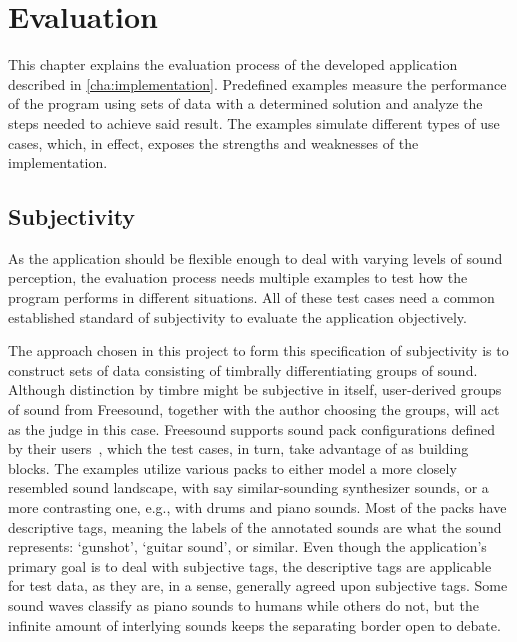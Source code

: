 \bgroup{}

\chapter{Evaluation}\label{cha:evaluation}
This chapter explains the evaluation process of the developed application described in \cref{cha:implementation}. Predefined examples measure the performance of the program using sets of data with a determined solution and analyze the steps needed to achieve said result. The examples simulate different types of use cases, which, in effect, exposes the strengths and weaknesses of the implementation.

\section{Subjectivity}
As the application should be flexible enough to deal with varying levels of sound perception, the evaluation process needs multiple examples to test how the program performs in different situations. All of these test cases need a common established standard of subjectivity to evaluate the application objectively.

The approach chosen in this project to form this specification of subjectivity is to construct sets of data consisting of timbrally differentiating groups of sound. Although distinction by timbre might be subjective in itself, user-derived groups of sound from Freesound, together with the author choosing the groups, will act as the judge in this case. Freesound supports sound pack configurations defined by their users~\cite{freesound:packs}, which the test cases, in turn, take advantage of as building blocks. The examples utilize various packs to either model a more closely resembled sound landscape, with say similar-sounding synthesizer sounds, or a more contrasting one, e.g., with drums and piano sounds. Most of the packs have descriptive tags, meaning the labels of the annotated sounds are what the sound represents: `gunshot', `guitar sound', or similar. Even though the application's primary goal is to deal with subjective tags, the descriptive tags are applicable for test data, as they are, in a sense, generally agreed upon subjective tags. Some sound waves classify as piano sounds to humans while others do not, but the infinite amount of interlying sounds keeps the separating border open to debate.


